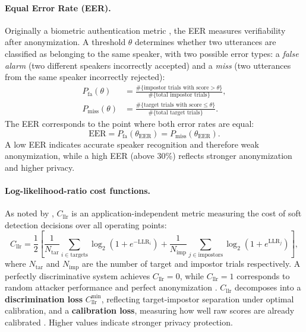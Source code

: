 \documentclass[12pt,leqno,a4paper]{article}
\begin{document}
\paragraph{Equal Error Rate (EER).}
Originally a biometric authentication metric \citep{noauthor_equal_nodate}, 
the EER measures verifiability after anonymization. A threshold $\theta$ 
determines whether two utterances are classified as belonging to the same 
speaker, with two possible error types: a \textit{false alarm} (two 
different speakers incorrectly accepted) and a \textit{miss} (two 
utterances from the same speaker incorrectly rejected):
\begin{equation}
\begin{aligned}
P_{\mathrm{fa}}(\theta)
  &= \frac{\#\{\text{impostor trials with score} > \theta\}}
           {\#\{\text{total impostor trials}\}}, \\[0.75em]
P_{\mathrm{miss}}(\theta)
  &= \frac{\#\{\text{target trials with score} \le \theta\}}
           {\#\{\text{total target trials}\}}.
\end{aligned}
\end{equation}
The EER corresponds to the point where both error rates are equal:
\begin{equation}
\mathrm{EER} = P_{\mathrm{fa}}(\theta_{\mathrm{EER}}) = 
P_{\mathrm{miss}}(\theta_{\mathrm{EER}}).
\end{equation}
A low EER indicates accurate speaker recognition and therefore weak 
anonymization, while a high EER (above 30\%) reflects stronger 
anonymization and higher privacy.

\paragraph{Log-likelihood-ratio cost functions.}
As noted by \cite{mingote21_interspeech}, $C_{\mathrm{llr}}$ is an 
application-independent metric measuring the cost of soft detection 
decisions over all operating points:
\begin{equation}
C_{\mathrm{llr}} = 
\frac{1}{2}
\left[
\frac{1}{N_{\mathrm{tar}}}
\sum_{i \in \text{targets}}
\log_{2}\!\left( 1 + e^{-\mathrm{LLR}_{i}} \right)
+
\frac{1}{N_{\mathrm{imp}}}
\sum_{j \in \text{impostors}}
\log_{2}\!\left( 1 + e^{\mathrm{LLR}_{j}} \right)
\right],
\end{equation}
where $N_{\mathrm{tar}}$ and $N_{\mathrm{imp}}$ are the number of target 
and impostor trials respectively. A perfectly discriminative system 
achieves $C_{\mathrm{llr}} = 0$, while $C_{\mathrm{llr}} = 1$ 
corresponds to random attacker performance and perfect anonymization 
\citep{10.1016/j.csl.2021.101299}. $C_{\mathrm{llr}}$ decomposes into 
a \textbf{discrimination loss} $C_{\mathrm{llr}}^{\min}$, reflecting 
target-impostor separation under optimal calibration, and a 
\textbf{calibration loss}, measuring how well raw scores are already 
calibrated \citep{tomashenko_voiceprivacy_2022-1}. Higher values indicate 
stronger privacy protection.
\end{document}
